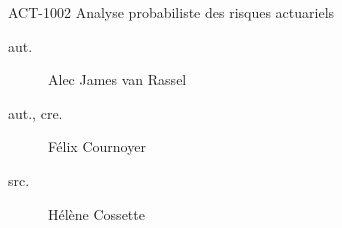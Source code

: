 \begin{contrib}{ACT-1002\: Analyse probabiliste des risques actuariels}
\begin{description}
	\item[aut.] Alec James van Rassel
	\item[aut., cre.] Félix Cournoyer
	\item[src.] Hélène Cossette
\end{description}
\end{contrib}